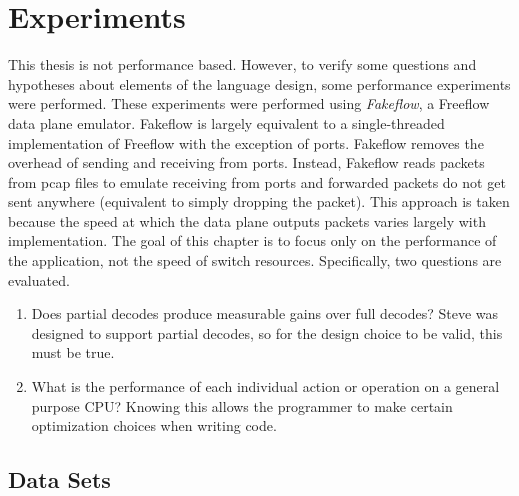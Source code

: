 \chapter{Experiments} \label{ch:experiments}


This thesis is not performance based. However, to verify some questions and hypotheses about elements of the language design, some performance experiments were performed.
These experiments were performed using \textit{Fakeflow}, a Freeflow data plane emulator. Fakeflow is largely equivalent to a single-threaded implementation of Freeflow with the exception of ports. Fakeflow removes the overhead of sending and receiving from ports. Instead, Fakeflow reads packets from pcap files to emulate receiving from ports and forwarded packets do not get sent anywhere (equivalent to simply dropping the packet). This approach is taken because the speed at which the data plane outputs packets varies largely with implementation. The goal of this chapter is to focus only on the performance of the application, not the speed of switch resources.
Specifically, two questions are evaluated.

\begin{enumerate}

\item Does partial decodes produce measurable gains over full decodes? Steve was designed to support partial decodes, so for the design choice to be valid, this must be true.

\item What is the performance of each individual action or operation on a general purpose CPU? Knowing this allows the programmer to make certain optimization choices when writing code.
\end{enumerate}

\section{Data Sets} \label{exp:use_cases}

